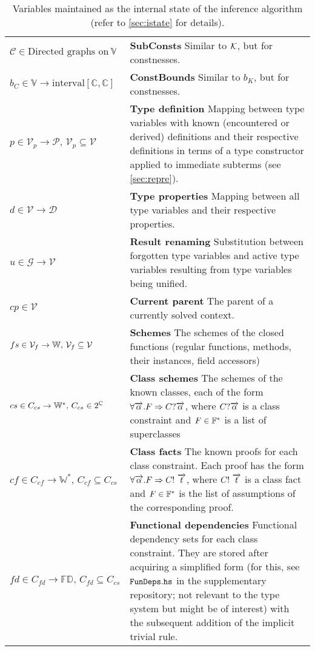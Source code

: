 \begin{table}
\begin{tabular}{p{.23\linewidth}p{.7\linewidth}}
  $\mathcal{C} \in \text{Directed graphs on}\ \mathbb{V}$ & \textbf{SubConsts}\quad
  Similar to $\mathcal{K}$, but for constnesses. \\

  $b_C \in \mathbb{V} \to \text{interval} \left[\mathbb{C}, \mathbb{C}\right]$ & \textbf{ConstBounds}\quad
  Similar to $b_K$, but for constnesses. \\

  $p \in \mathcal{V}_p \to \mathcal{P},\,\mathcal{V}_p \subseteq \mathcal{V}$ & \textbf{Type definition}\quad
  Mapping between type variables with known (encountered or derived) definitions and their respective definitions in terms of a type constructor applied to immediate subterms (see \cref{sec:repre}). \\

  $d \in \mathcal{V} \to \mathcal{D}$ & \textbf{Type properties}\quad
  Mapping between all type variables and their respective properties. \\

  $u \in \mathcal{G} \to \mathcal{V}$ & \textbf{Result renaming}\quad
  Substitution between forgotten type variables and active type variables resulting from type variables being unified. \\

  $cp \in \mathcal{V}$ & \textbf{Current parent}\quad
  The parent of a currently solved context. \\

  $fs \in \mathcal{V}_f \to \mathbb{W},\,\mathcal V_f \subseteq \mathcal V$ & \textbf{Schemes}\quad
  The schemes of the closed functions (regular functions, methods, their instances, field accessors) \\

  $cs \in C_{cs} \to \mathbb{W}^\ast,\,C_{cs} \in 2^{\mathbb{C}}$ & \textbf{Class schemes}\quad
  The schemes of the known classes, each of the form $\forall \overrightarrow{\alpha} . F \Rightarrow C?  \overrightarrow{\alpha}$, where $C?  \overrightarrow{\alpha}$ is a class constraint and $F \in {\mathbb{F}}^\ast$ is a list of superclasses \\

  $cf \in C_{cf} \to \mathbb{W}^\ast,\,C_{cf} \subseteq C_{cs}$ & \textbf{Class facts}\quad
  The known proofs for each class constraint. Each proof has the form $\forall \overrightarrow{\alpha} . F \Rightarrow C!\ \overrightarrow{t}$, where $C!\ \overrightarrow{t}$ is a class fact and $F \in {\mathbb{F}}^\ast$ is the list of assumptions of the corresponding proof. \\

  $fd \in C_{fd} \to \mathbb{FD},\,C_{fd} \subseteq C_{cs}$ & \textbf{Functional dependencies}\quad
  Functional dependency sets for each class constraint. They are stored after acquiring a simplified form (for this, see $\mathtt{FunDeps.hs}$ in the supplementary repository; not relevant to the type system but might be of interest) with the subsequent addition of the implicit trivial rule. \\
\bottomrule
\end{tabular}
\caption{Variables maintained as the internal state of the inference algorithm (refer to \cref{sec:istate} for details).}
\label{tab:istate}
\end{table}


